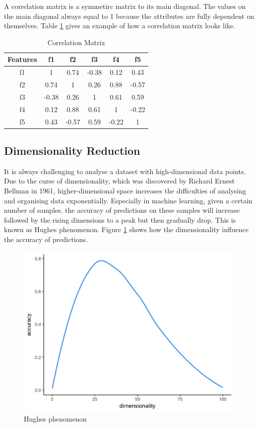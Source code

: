 \documentclass[11pt]{article} %
\theoremstyle{plain}
\theoremstyle{definition}
\begin{document}
A correlation matrix is a symmetirc matrix to its main diagonal. The values on the main diagonal always equal to 1 because the attributes are fully dependent on themselves. Table \ref{table:cormat} gives an example of how a correlation matrix looks like.

{
  \begin{table}[ht]
    \centering
    \begin{tabular}{|c|c c c c c|}
      \hline
      Features & f1 & f2 & f3 & f4 & f5 \\ [0.5ex]
      \hline
      f1 & 1 & 0.74 & -0.38 & 0.12 & 0.43 \\ 
      \hline
      f2 & 0.74 & 1 & 0.26 & 0.88 & -0.57 \\
      \hline
      f3 & -0.38 & 0.26 & 1 & 0.61 & 0.59 \\
      \hline
      f4 & 0.12 & 0.88 & 0.61 & 1 & -0.22 \\
      \hline
      f5 & 0.43 & -0.57 & 0.59 & -0.22 & 1 \\ 
      \hline
    \end{tabular}
    \caption{Correlation Matrix}
    \label{table:cormat}
  \end{table}
}

\subsection{Dimensionality Reduction}

It is always challenging to analyse a dataset with high-dimensional data points. Due to the curse of dimensionality, which was discovered by Richard Ernest Bellman in 1961, higher-dimensional space increases the difficulties of analysing and organising data exponentially\cite{wiki/cod:2018}. Especially in machine learning, given a certain number of samples, the accuracy of predictions on these samples will increase followed by the rising dimensions to a peak but then gradually drop. This is known as Hughes phenomenon\cite{hughes/itoit:1968}. Figure \ref{fig:hughes} shows how the dimensionality influence the accuracy of predictions.

\begin{figure}[ht]
  \includegraphics[width=0.8\linewidth, center]{resources/dimensionality.png}
  \caption{Hughes phenomenon}
  \label{fig:hughes}
\end{figure}
\end{document}
